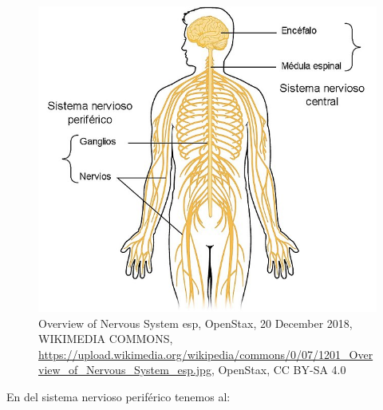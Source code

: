 \begin{figure}[h]
 \centering
 \includegraphics[scale=0.5]{../Figuras/Nervous_System.jpg}
 \caption{Overview of Nervous System esp, OpenStax, 20 December 2018, WIKIMEDIA COMMONS, \url{https://upload.wikimedia.org/wikipedia/commons/0/07/1201_Overview_of_Nervous_System_esp.jpg}, OpenStax, CC BY-SA 4.0}
 \label{fig:SNCySNP}
\end{figure}

En del sistema nervioso periférico tenemos al:


